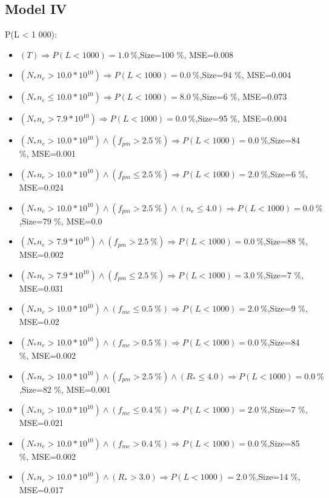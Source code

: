 \documentclass[numbered]{CSL}
\begin{document}
\subsection{Model IV}
P(L < 1 000):
\begin{itemize}
\item $(T) \Rightarrow P(L < 1 000) = 1.0~\%$,\hfill Size=100 \%, MSE=0.008
\item $(N_* n_e > 10.0 * 10^{10}) \Rightarrow P(L < 1 000) = 0.0~\%$,\hfill Size=94 \%, MSE=0.004
\item $(N_* n_e \leq 10.0 * 10^{10}) \Rightarrow P(L < 1 000) = 8.0~\%$,\hfill Size=6 \%, MSE=0.073
\item $(N_* n_e > 7.9 * 10^{10}) \Rightarrow P(L < 1 000) = 0.0~\%$,\hfill Size=95 \%, MSE=0.004
\item $(N_* n_e > 10.0 * 10^{10}) \land (f_{pm} > 2.5~\%) \Rightarrow P(L < 1 000) = 0.0~\%$,\hfill Size=84 \%, MSE=0.001
\item $(N_* n_e > 10.0 * 10^{10}) \land (f_{pm} \leq 2.5~\%) \Rightarrow P(L < 1 000) = 2.0~\%$,\hfill Size=6 \%, MSE=0.024
\item $(N_* n_e > 10.0 * 10^{10}) \land (f_{pm} > 2.5~\%) \land (n_e \leq 4.0) \Rightarrow P(L < 1 000) = 0.0~\%$,\hfill Size=79 \%, MSE=0.0
\item $(N_* n_e > 7.9 * 10^{10}) \land (f_{pm} > 2.5~\%) \Rightarrow P(L < 1 000) = 0.0~\%$,\hfill Size=88 \%, MSE=0.002
\item $(N_* n_e > 7.9 * 10^{10}) \land (f_{pm} \leq 2.5~\%) \Rightarrow P(L < 1 000) = 3.0~\%$,\hfill Size=7 \%, MSE=0.031
\item $(N_* n_e > 10.0 * 10^{10}) \land (f_{me} \leq 0.5~\%) \Rightarrow P(L < 1 000) = 2.0~\%$,\hfill Size=9 \%, MSE=0.02
\item $(N_* n_e > 10.0 * 10^{10}) \land (f_{me} > 0.5~\%) \Rightarrow P(L < 1 000) = 0.0~\%$,\hfill Size=84 \%, MSE=0.002
\item $(N_* n_e > 10.0 * 10^{10}) \land (f_{pm} > 2.5~\%) \land (R_* \leq 4.0) \Rightarrow P(L < 1 000) = 0.0~\%$,\hfill Size=82 \%, MSE=0.001
\item $(N_* n_e > 10.0 * 10^{10}) \land (f_{me} \leq 0.4~\%) \Rightarrow P(L < 1 000) = 2.0~\%$,\hfill Size=7 \%, MSE=0.021
\item $(N_* n_e > 10.0 * 10^{10}) \land (f_{me} > 0.4~\%) \Rightarrow P(L < 1 000) = 0.0~\%$,\hfill Size=85 \%, MSE=0.002
\item $(N_* n_e > 10.0 * 10^{10}) \land (R_* > 3.0) \Rightarrow P(L < 1 000) = 2.0~\%$,\hfill Size=14 \%, MSE=0.017

\end{itemize}
\end{document}
